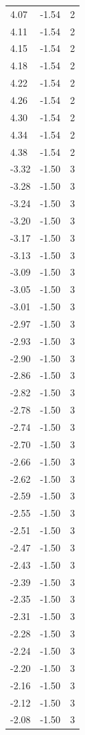 \begin{longtable}{lrr}
  4.07 & -1.54 & 2 \\
  4.11 & -1.54 & 2 \\
  4.15 & -1.54 & 2 \\
  4.18 & -1.54 & 2 \\
  4.22 & -1.54 & 2 \\
  4.26 & -1.54 & 2 \\
  4.30 & -1.54 & 2 \\
  4.34 & -1.54 & 2 \\
  4.38 & -1.54 & 2 \\
  -3.32 & -1.50 & 3 \\
  -3.28 & -1.50 & 3 \\
  -3.24 & -1.50 & 3 \\
  -3.20 & -1.50 & 3 \\
  -3.17 & -1.50 & 3 \\
  -3.13 & -1.50 & 3 \\
  -3.09 & -1.50 & 3 \\
  -3.05 & -1.50 & 3 \\
  -3.01 & -1.50 & 3 \\
  -2.97 & -1.50 & 3 \\
  -2.93 & -1.50 & 3 \\
  -2.90 & -1.50 & 3 \\
  -2.86 & -1.50 & 3 \\
  -2.82 & -1.50 & 3 \\
  -2.78 & -1.50 & 3 \\
  -2.74 & -1.50 & 3 \\
  -2.70 & -1.50 & 3 \\
  -2.66 & -1.50 & 3 \\
  -2.62 & -1.50 & 3 \\
  -2.59 & -1.50 & 3 \\
  -2.55 & -1.50 & 3 \\
  -2.51 & -1.50 & 3 \\
  -2.47 & -1.50 & 3 \\
  -2.43 & -1.50 & 3 \\
  -2.39 & -1.50 & 3 \\
  -2.35 & -1.50 & 3 \\
  -2.31 & -1.50 & 3 \\
  -2.28 & -1.50 & 3 \\
  -2.24 & -1.50 & 3 \\
  -2.20 & -1.50 & 3 \\
  -2.16 & -1.50 & 3 \\
  -2.12 & -1.50 & 3 \\
  -2.08 & -1.50 & 3 \\

\end{longtable}
